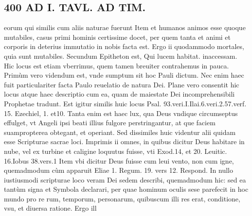 \documentclass{article}
\begin{document}
\begin{pages}
\section*{400 AD I. TAVL. AD TIM. }\pstart eorum qui similis cum aliis naturae fuerunt Item et humanos animos esse quoque mutabiles, casus primi hominis certissime docet, per quem tanta et animi et corporis in deterius immutatio in nobis facta est. Ergo ii quodammodo mortales, quia sunt mutabiles.  \pend\pstart Secundum Epitheton est, Qui lucem habitat. inaccessam. Hic locus est etiam vberrimus, quem tamen breuiter contrahemus in pauca. Primùm vero videndum est, vnde sumptum sit hoc Pauli dictum. Nec enim haec fuit particulariter facta Paulo reuelatio de natura Dei. Plane vero consentit hic locus atque haec descriptio cum ea, quam de maiestate Dei incomprehensibili Prophetae tradunt. Est igitur similis huic locus Psal. 93.veri.I.Ilai.6.veri.2.57.verf. 15. Ezechiel, 1. et10. Tanta enim est haec lux, qua Deus vndique circumseptus effulget, vt Angeli ipsi beati illius fulgore perstringantur, at que faciem suampropterea obtegant, et operiant.  \pend\pstart Sed dissimiles huic videntur alii quidam esse Scripturae sacrae loci. Imprimis ii omnes, in quibus dicitur Deus habitare in nube, vel ex turbine et caligine loquutus fuisse, vti Exod.14, et 20. Leuitic. 16.Iobus 38.vers.1 Item vbi dicitur Deus fuisse cum leui vento, non cum igne, quemadmodum cùm apparuit Eliae 1. Regum. 19. vers 12. Respond. In nullo iustiusmodi scripturae loco veram Dei sedem describi, quemadmodum hic: sed ea tantùm signa et Symbola declarari, per quae hominum oculis sese parefecit in hoc mundo pro re rum, temporum, personarum, quibuscum illi res erat, conditione, vsu, et diuersa ratione. Ergo ill  \pend

\end{pages}
\end{document}
